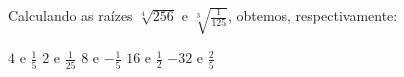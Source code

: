 Calculando as raízes $\sqrt[4]{256}$ e $\sqrt[3]{\frac{1}{125}}$, obtemos, respectivamente:

$4$ e $\frac{1}{5}$
$2$ e $\frac{1}{25}$
$8$ e $-\frac{1}{5}$
$16$ e $\frac{1}{2}$
$-32$ e $\frac{2}{5}$


